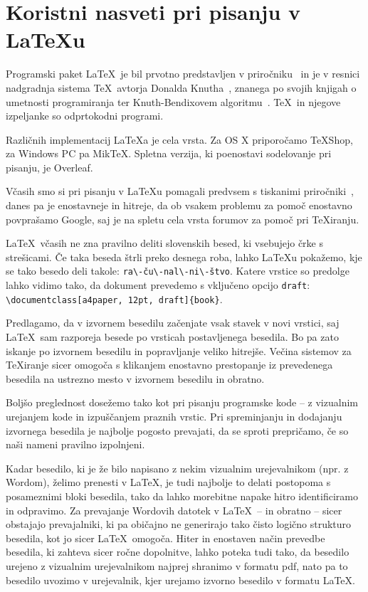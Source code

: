 \documentclass[a4paper,12pt,openright]{book}
\begin{document}
    \chapter{Koristni nasveti pri pisanju v \LaTeX{u}}
    \label{latex}

    Programski paket \LaTeX\ je bil prvotno predstavljen v priročniku~\cite{lamport} in je v resnici nadgradnja sistema \TeX\ avtorja Donalda Knutha~\cite{knuth},
    znanega po svojih knjigah o umetnosti programiranja
    ter Knuth-Bendixovem algoritmu~\cite{knuth1983simple}.
    \TeX\ in njegove izpeljanke so odprtokodni programi.

    Različnih implementacij \LaTeX{}a je cela vrsta.
    Za OS X priporočamo TeXShop, za Windows PC pa MikTeX.
    Spletna verzija, ki poenostavi sodelovanje pri pisanju, je Overleaf.

    Včasih smo si pri pisanju v \LaTeX{}u pomagali predvsem s tiskanimi pri\-ro\-čni\-ki~\cite{lamport}, danes pa je enostavneje in hitreje, da ob vsakem problemu za pomoč enostavno povprašamo Google,
    saj je na spletu cela vrsta forumov za pomoč pri \TeX iranju.

    \LaTeX\ včasih ne zna pravilno deliti slovenskih besed, ki vsebujejo črke s streši\-ca\-mi.
    Če taka beseda štrli preko desnega roba,  lahko \LaTeX{}u pokažemo, kje se tako besedo deli takole: \verb=ra\-ču\-nal\-ni\-štvo=.
    Katere vrstice so predolge lahko vidimo tako, da dokument prevedemo s vključeno opcijo \texttt{draft}: \verb=\documentclass[a4paper, 12pt, draft]{book}=.

    Predlagamo, da v izvornem besedilu začenjate vsak stavek v novi vrstici, saj \LaTeX\ sam razporeja besede po vrsticah postavljenega besedila.
    Bo pa zato iskanje po izvornem besedilu in popravljanje veliko hitrejše.
    Večina sistemov za \TeX{}iranje sicer omogoča s klikanjem enostavno prestopanje iz prevedenega besedila na ustrezno mesto v izvornem besedilu in obratno.

    Boljšo preglednost dosežemo tako kot pri pisanju programske kode -- z vizualnim urejanjem kode in izpuščanjem praznih vrstic.
    Pri spreminjanju in dodajanju izvornega besedila je najbolje pogosto prevajati, da se sproti prepričamo, če so naši nameni pravilno izpolnjeni.

    Kadar besedilo, ki je že bilo napisano z nekim vizualnim urejevalnikom (npr. z Wordom), želimo prenesti v \LaTeX, je tudi najbolje to delati postopoma s posameznimi bloki besedila,
    tako da lahko morebitne napake hitro identificiramo in odpravimo.
    Za prevajanje Wordovih datotek v \LaTeX\ -- in obratno -- sicer obstajajo prevajalniki, ki pa običajno ne generirajo tako čisto logično strukturo besedila, kot jo sicer \LaTeX\ omogoča.
    Hiter in enostaven način prevedbe besedila, ki zahteva sicer ročne dopolnitve, lahko poteka tudi tako, da besedilo urejeno z vizualnim urejevalnikom najprej shranimo v formatu pdf,
    nato pa to besedilo uvozimo v urejevalnik, kjer urejamo izvorno besedilo v formatu \LaTeX.
\end{document}
